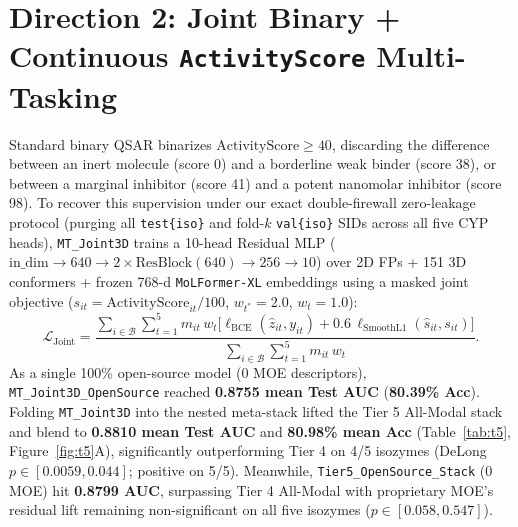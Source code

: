 \documentclass[11pt]{article}
\begin{document}
\section{Direction 2: Joint Binary + Continuous \texttt{ActivityScore} Multi-Tasking}
Standard binary QSAR binarizes $\text{ActivityScore} \ge 40$, discarding the difference between an inert molecule (score 0) and a borderline weak binder (score 38), or between a marginal inhibitor (score 41) and a potent nanomolar inhibitor (score 98). To recover this supervision under our exact double-firewall zero-leakage protocol (purging all \texttt{test\{iso\}} and fold-$k$ \texttt{val\{iso\}} SIDs across all five CYP heads), \texttt{MT\_Joint3D} trains a 10-head Residual MLP ($\text{in\_dim} \to 640 \to 2\times\text{ResBlock}(640) \to 256 \to 10$) over 2D FPs + 151 3D conformers + frozen 768-d \texttt{MoLFormer-XL} embeddings using a masked joint objective ($s_{it} = \text{ActivityScore}_{it}/100$, $w_{t^*}=2.0$, $w_t=1.0$):
\begin{equation}
  \mathcal{L}_{\text{Joint}} = \frac{\sum_{i \in \mathcal{B}} \sum_{t=1}^{5} m_{it}\, w_t \Big[\ell_{\text{BCE}}(\hat{z}_{it}, y_{it}) + 0.6\,\ell_{\text{SmoothL1}}(\hat{s}_{it}, s_{it})\Big]}{\sum_{i \in \mathcal{B}} \sum_{t=1}^{5} m_{it}\, w_t}.
\end{equation}
As a single 100\% open-source model (0 MOE descriptors), \texttt{MT\_Joint3D\_OpenSource} reached \textbf{0.8755 mean Test AUC} (\textbf{80.39\% Acc}). Folding \texttt{MT\_Joint3D} into the nested meta-stack lifted the Tier 5 All-Modal stack and blend to \textbf{0.8810 mean Test AUC} and \textbf{80.98\% mean Acc} (Table~\ref{tab:t5}, Figure~\ref{fig:t5}A), significantly outperforming Tier 4 on 4/5 isozymes (DeLong $p \in [0.0059, 0.044]$; positive on 5/5). Meanwhile, \texttt{Tier5\_OpenSource\_Stack} (0 MOE) hit \textbf{0.8799 AUC}, surpassing Tier 4 All-Modal with proprietary MOE's residual lift remaining non-significant on all five isozymes ($p \in [0.058, 0.547]$).
\end{document}
